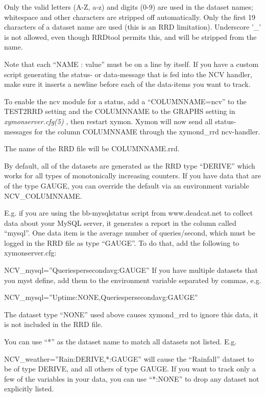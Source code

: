   Only the valid letters (A-Z, a-z) and digits (0-9) are used in the dataset names; whitespace and other characters are stripped off automatically. Only the first 19 characters of a dataset name are used (this is an RRD limitation). Underscore '\_' is not allowed, even though RRDtool permits this, and will be stripped from the name. 


  Note that each ``NAME : value'' must be on a line by itself. If you have a custom script generating the status- or data-message that is fed into the NCV handler, make sure it inserts a newline before each of the data-items you want to track. 


  To enable the ncv module for a status, add a ``COLUMNNAME=ncv'' to the TEST2RRD setting and the COLUMNNAME to the GRAPHS setting in \emph{xymonserver.cfg(5)}
 , then restart xymon. Xymon will now send all status-messages for the column COLUMNNAME through the xymond\_rrd ncv-handler. 


  The name of the RRD file will be COLUMNNAME.rrd. 


  By default, all of the datasets are generated as the RRD type ``DERIVE'' which works for all types of monotonically increasing counters. If you have data that are of the type GAUGE, you can override the default via an environment variable NCV\_COLUMNNAME. 


  E.g. if you are using the bb-mysqlstatus script from www.deadcat.net to collect data about your MySQL server, it generates a report in the column called ``mysql''. One data item is the average number of queries/second, which must be logged in the RRD file as type ``GAUGE''. To do that, add the following to xymonserver.cfg:  
 
NCV\_mysql=''Queriespersecondavg:GAUGE''  
 If you have multiple datasets that you myst define, add them to the environment variable separated by commas, e.g.  
 
NCV\_mysql=''Uptime:NONE,Queriespersecondavg:GAUGE''  



  The dataset type ``NONE'' used above causes xymond\_rrd to ignore this data, it is not included in the RRD file. 


  You can use ``*'' as the dataset name to match all datasets not listed. E.g.  
 
NCV\_weather=''Rain:DERIVE,*:GAUGE''  
 will cause the ``Rainfall'' dataset to be of type DERIVE, and all others of type GAUGE. If you want to track only a few of the variables in your data, you can use ``*:NONE'' to drop any dataset not explicitly listed. 


